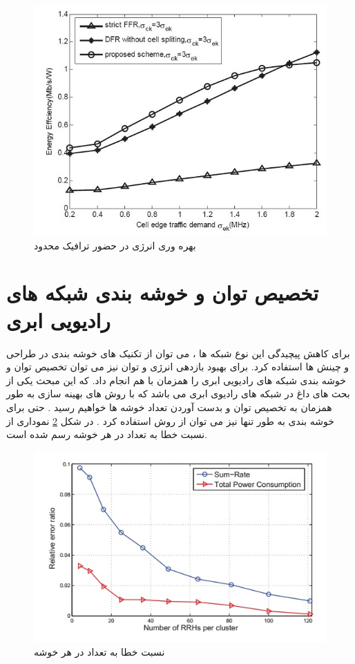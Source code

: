 \begin{figure}
  \centering
    \includegraphics[scale=0.7]{8}
  \caption{  بهره وری انرژی در حضور ترافیک محدود \cite{graph} }
  \label{fig:8}
\end{figure}
\section{تخصیص توان و خوشه بندی شبکه های رادیویی ابری}
برای کاهش پیچیدگی این نوع شبکه ها ، می توان از تکنیک های خوشه بندی در طراحی و چینش ها استفاده کرد. برای بهبود بازدهی انرژی و توان نیز می توان تخصیص توان و خوشه بندی شبکه های رادیویی ابری را همزمان با هم انجام داد. 
که این مبحث یکی از بحث های داغ در شبکه های رادیوی ابری می باشد که با روش های بهینه سازی به طور همزمان به تخصیص توان و بدست آوردن تعداد خوشه ها خواهیم رسید .
حتی برای خوشه بندی به طور تنها نیز می توان از روش  استفاده کرد . در شکل \ref{fig:88} نموداری از نسبت خطا به تعداد   در هر خوشه رسم شده است. 
\begin{figure}
  \centering
    \includegraphics[scale=0.7]{88}
  \caption{  نسبت خطا به تعداد  در هر خوشه \cite{graph}  }
  \label{fig:88}
\end{figure}
